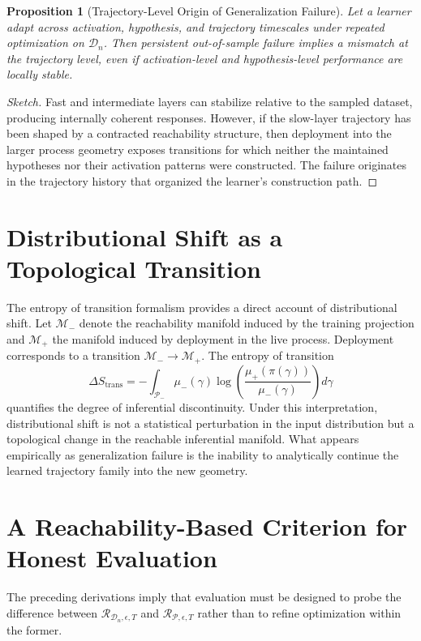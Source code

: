 \documentclass[12pt]{article}
\theoremstyle{plain}
\newtheorem{proposition}[theorem]{Proposition}
\theoremstyle{definition}
\theoremstyle{remark}
\begin{document}
\begin{proposition}[Trajectory-Level Origin of Generalization Failure]
Let a learner adapt across activation, hypothesis, and trajectory timescales under repeated optimization on $\mathcal{D}_n$. Then persistent out-of-sample failure implies a mismatch at the trajectory level, even if activation-level and hypothesis-level performance are locally stable.
\end{proposition}

\begin{proof}[Sketch]
Fast and intermediate layers can stabilize relative to the sampled dataset, producing internally coherent responses. However, if the slow-layer trajectory has been shaped by a contracted reachability structure, then deployment into the larger process geometry exposes transitions for which neither the maintained hypotheses nor their activation patterns were constructed. The failure originates in the trajectory history that organized the learner's construction path.
\end{proof}

\section{Distributional Shift as a Topological Transition}

The entropy of transition formalism provides a direct account of distributional shift. Let $\mathcal{M}_-$ denote the reachability manifold induced by the training projection and $\mathcal{M}_+$ the manifold induced by deployment in the live process. Deployment corresponds to a transition $\mathcal{M}_- \to \mathcal{M}_+$. The entropy of transition
\[
\Delta S_{\mathrm{trans}} = -\int_{\mathcal{P}_-} \mu_-(\gamma) \log \left( \frac{\mu_+(\pi(\gamma))}{\mu_-(\gamma)} \right) d\gamma
\]
quantifies the degree of inferential discontinuity. Under this interpretation, distributional shift is not a statistical perturbation in the input distribution but a topological change in the reachable inferential manifold. What appears empirically as generalization failure is the inability to analytically continue the learned trajectory family into the new geometry.

\section{A Reachability-Based Criterion for Honest Evaluation}

The preceding derivations imply that evaluation must be designed to probe the difference between $\mathcal{R}_{\mathcal{D}_n,\epsilon,T}$ and $\mathcal{R}_{\mathcal{P},\epsilon,T}$ rather than to refine optimization within the former.
\end{document}
